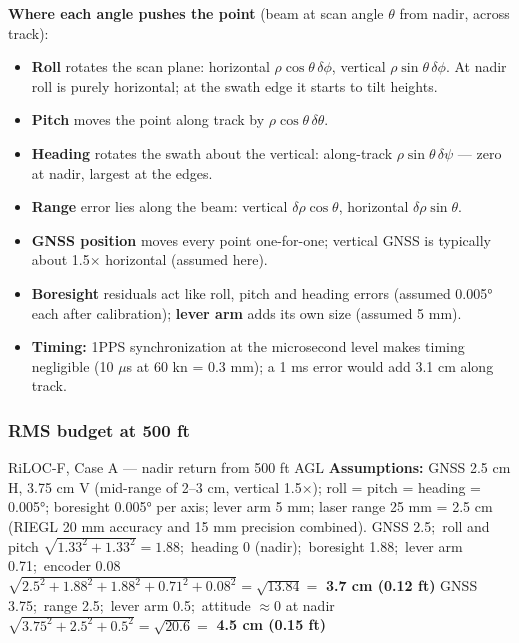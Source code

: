 \begin{eng}
\textbf{Where each angle pushes the point} (beam at scan angle $\theta$ from nadir, across track):
\begin{itemize}
\item \textbf{Roll} rotates the scan plane: horizontal $\rho\cos\theta\,\delta\phi$, vertical $\rho\sin\theta\,\delta\phi$. At nadir roll is purely horizontal; at the swath edge it starts to tilt heights.
\item \textbf{Pitch} moves the point along track by $\rho\cos\theta\,\delta\theta$.
\item \textbf{Heading} rotates the swath about the vertical: along-track $\rho\sin\theta\,\delta\psi$ --- zero at nadir, largest at the edges.
\item \textbf{Range} error lies along the beam: vertical $\delta\rho\cos\theta$, horizontal $\delta\rho\sin\theta$.
\item \textbf{GNSS position} moves every point one-for-one; vertical GNSS is typically about 1.5$\times$ horizontal (assumed here).
\item \textbf{Boresight} residuals act like roll, pitch and heading errors (assumed 0.005° each after calibration); \textbf{lever arm} adds its own size (assumed 5 mm).
\item \textbf{Timing:} 1PPS synchronization at the microsecond level makes timing negligible (10 $\mu$s at 60 kn = 0.3 mm); a 1 ms error would add 3.1 cm along track.
\end{itemize}
\end{eng}

\subsubsection*{RMS budget at 500 ft}
\begin{worked}{RiLOC-F, Case A --- nadir return from 500 ft AGL}
\textbf{Assumptions:} GNSS 2.5 cm H, 3.75 cm V (mid-range of 2--3 cm, vertical 1.5$\times$); roll = pitch = heading = 0.005°; boresight 0.005° per axis; lever arm 5 mm; laser range 25 mm = 2.5 cm (RIEGL 20 mm accuracy and 15 mm precision combined).
 GNSS 2.5;\ roll and pitch $\sqrt{1.33^2+1.33^2}=1.88$;\ heading 0 (nadir);\ boresight 1.88;\ lever arm 0.71;\ encoder 0.08\\
$\sqrt{2.5^2+1.88^2+1.88^2+0.71^2+0.08^2}=\sqrt{13.84}=$ \textbf{3.7 cm (0.12 ft)}
 GNSS 3.75;\ range 2.5;\ lever arm 0.5;\ attitude $\approx0$ at nadir\\
$\sqrt{3.75^2+2.5^2+0.5^2}=\sqrt{20.6}=$ \textbf{4.5 cm (0.15 ft)}
\end{worked}

